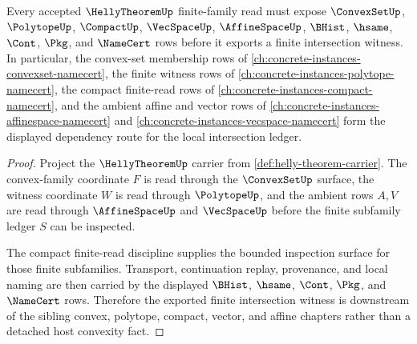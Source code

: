 \begin{theorem}
\label{thm:helly-theorem-finite-convex-family-budget}
Every accepted $\HellyTheoremUp$ finite-family read must expose $\ConvexSetUp$, $\PolytopeUp$, $\CompactUp$, $\VecSpaceUp$, $\AffineSpaceUp$, $\BHist$, $\hsame$, $\Cont$, $\Pkg$, and $\NameCert$ rows before it exports a finite intersection witness. In particular, the convex-set membership rows of \autoref{ch:concrete-instances-convexset-namecert}, the finite witness rows of \autoref{ch:concrete-instances-polytope-namecert}, the compact finite-read rows of \autoref{ch:concrete-instances-compact-namecert}, and the ambient affine and vector rows of \autoref{ch:concrete-instances-affinespace-namecert} and \autoref{ch:concrete-instances-vecspace-namecert} form the displayed dependency route for the local intersection ledger.
\end{theorem}
\begin{proof}
Project the $\HellyTheoremUp$ carrier from \autoref{def:helly-theorem-carrier}. The convex-family coordinate $F$ is read through the $\ConvexSetUp$ surface, the witness coordinate $W$ is read through $\PolytopeUp$, and the ambient rows $A,V$ are read through $\AffineSpaceUp$ and $\VecSpaceUp$ before the finite subfamily ledger $S$ can be inspected.

The compact finite-read discipline supplies the bounded inspection surface for those finite subfamilies. Transport, continuation replay, provenance, and local naming are then carried by the displayed $\BHist$, $\hsame$, $\Cont$, $\Pkg$, and $\NameCert$ rows. Therefore the exported finite intersection witness is downstream of the sibling convex, polytope, compact, vector, and affine chapters rather than a detached host convexity fact.
\end{proof}
